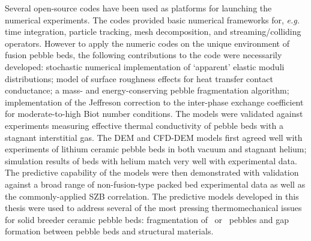 {Several open-source codes have been used as platforms for launching the numerical experiments. The codes provided basic numerical frameworks for, \textit{e.g.} time integration, particle tracking, mesh decomposition, and streaming/colliding operators. However to apply the numeric codes on the unique environment of fusion pebble beds, the following contributions to the code were necessarily developed: stochastic numerical implementation of `apparent' elastic moduli distributions; model of surface roughness effects for heat transfer contact conductance; a mass- and energy-conserving pebble fragmentation algorithm; implementation of the Jeffreson correction to the inter-phase exchange coefficient for moderate-to-high Biot number conditions. The models were validated against experiments measuring effective thermal conductivity of pebble beds with a stagnant interstitial gas. The DEM and CFD-DEM models first agreed well with experiments of lithium ceramic pebble beds in both vacuum and stagnant helium; simulation results of beds with helium match very well with experimental data. The predictive capability of the models were then demonstrated with validation against a broad range of non-fusion-type packed bed experimental data as well as the commonly-applied SZB correlation. The predictive models developed in this thesis were used to address several of the most pressing thermomechanical issues for solid breeder ceramic pebble beds: fragmentation of \lit~or \lis~pebbles and gap formation between pebble beds and structural materials. 




}
